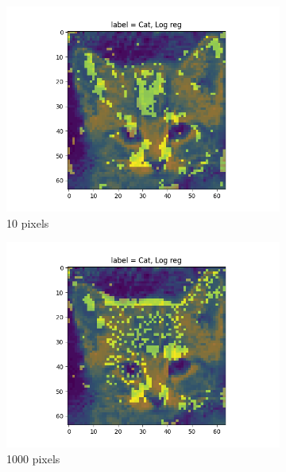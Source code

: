 \documentclass{article}
\begin{document}
\begin{figure}[H]
\begin{subfigure}{.33\textwidth}
  \centering
  \includegraphics[width=1\linewidth]{2e/,10, Log reg.png} 
  \caption{10 pixels}
  \label{fig:sub-first}
\end{subfigure}
\begin{subfigure}{.33\textwidth}
  \centering
  \includegraphics[width=1\linewidth]{2e/,1000, Log reg.png}  
  \caption{1000 pixels}
  \label{fig:sub-second}
\end{subfigure}
\begin{subfigure}{.33\textwidth}
  \centering

\end{subfigure}
\end{figure}
\end{document}
